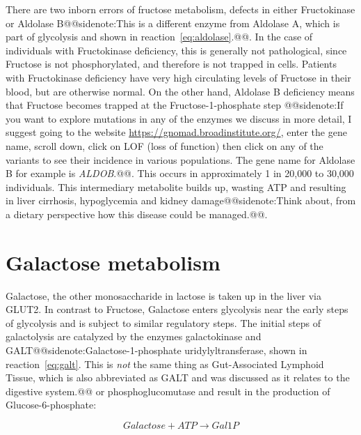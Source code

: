 \documentclass{tufte-handout}
\makeatletter
\def\sidenote#1{@@sidenote:#1@@}
\makeatother
\begin{document}
There are two inborn errors of fructose metabolism, defects in either Fructokinase or Aldolase B\sidenote{This is a different enzyme from Aldolase A, which is part of glycolysis and shown in reaction~\ref{eq:aldolase}.}.  In the case of individuals with Fructokinase deficiency, this is generally not pathological, since Fructose is not phosphorylated, and therefore is not trapped in cells.  Patients with Fructokinase deficiency have very high circulating levels of Fructose in their blood, but are otherwise normal.  On the other hand, Aldolase B deficiency means that Fructose becomes trapped at the Fructose-1-phosphate step \citep{Cross1988}\sidenote{If you want to explore mutations in any of the enzymes we discuss in more detail, I suggest going to the website \url{https://gnomad.broadinstitute.org/}, enter the gene name, scroll down, click on LOF (loss of function) then click on any of the variants to see their incidence in various populations.  The gene name for Aldolase B for example is \textit{ALDOB}.}.  This occurs in approximately 1 in 20,000 to 30,000 individuals.  This intermediary metabolite builds up, wasting ATP and resulting in liver cirrhosis, hypoglycemia and kidney damage\sidenote{Think about, from a dietary perspective how this disease could be managed.}.

\section{Galactose metabolism}

Galactose, the other monosaccharide in lactose is taken up in the liver via GLUT2.  In contrast to Fructose, Galactose enters glycolysis near the early steps of glycolysis and is subject to similar regulatory steps.  The initial steps of galactolysis are catalyzed by the enzymes galactokinase and GALT\sidenote{Galactose-1-phosphate uridylyltransferase, shown in reaction~\ref{eq:galt}.  This is \emph{not} the same thing as Gut-Associated Lymphoid Tissue, which is also abbreviated as GALT and was discussed as it relates to the digestive system.} or phosphoglucomutase and result in the production of Glucose-6-phosphate:

\begin{equation}
Galactose + ATP \rightarrow Gal1P
\end{equation}
\end{document}
